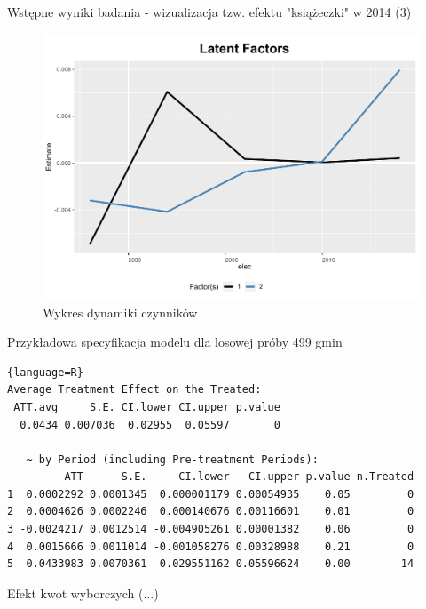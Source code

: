 \documentclass[12pt]{beamer}
\begin{document}
\begin{frame}{Wstępne wyniki badania - wizualizacja tzw. efektu "książeczki" w 2014 (3)}
    
\begin{figure}
\includegraphics[scale=0.42]{ife_no_pred_2_factors_sample_0_2_factors.pdf}
\caption{\label{fig:did}Wykres dynamiki czynników}
\end{figure}
    
\end{frame}

\begin{frame}[fragile]{Przykładowa specyfikacja modelu dla losowej próby 499 gmin}

\scriptsize

\begin{lstlisting}{language=R}
Average Treatment Effect on the Treated:
 ATT.avg     S.E. CI.lower CI.upper p.value
  0.0434 0.007036  0.02955  0.05597       0

   ~ by Period (including Pre-treatment Periods):
         ATT      S.E.     CI.lower   CI.upper p.value n.Treated
1  0.0002292 0.0001345  0.000001179 0.00054935    0.05         0
2  0.0004626 0.0002246  0.000140676 0.00116601    0.01         0
3 -0.0024217 0.0012514 -0.004905261 0.00001382    0.06         0
4  0.0015666 0.0011014 -0.001058276 0.00328988    0.21         0
5  0.0433983 0.0070361  0.029551162 0.05596624    0.00        14
\end{lstlisting}

\end{frame}

\begin{frame}{Efekt kwot wyborczych}
(...)
\end{frame}
\end{document}
